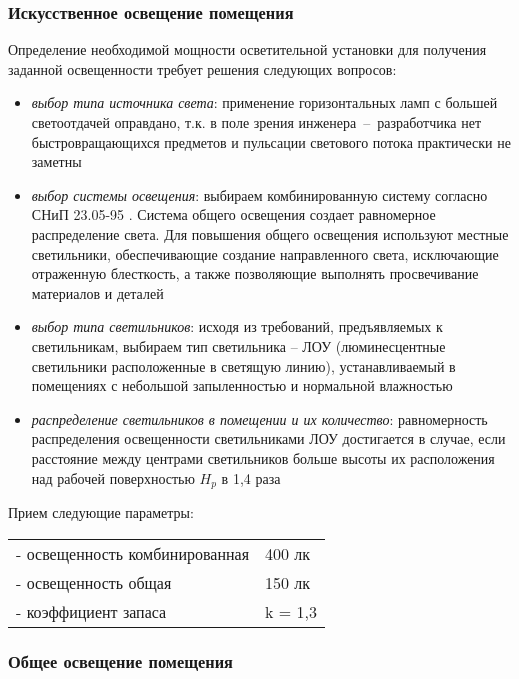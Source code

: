 \subsubsection{Искусственное освещение помещения}

Определение необходимой мощности осветительной установки для получения заданной
освещенности требует решения следующих вопросов:

\begin{itemize}
    \item \textit{выбор типа источника света}: применение горизонтальных ламп с
    большей светоотдачей оправдано, т.к. в поле зрения инженера~--~разработчика
    нет быстровращающихся предметов и пульсации светового потока практически не
    заметны

    \item \textit{выбор системы освещения}: выбираем комбинированную систему
    согласно СНиП 23.05-95 \cite{ecology_snip_23_05_85}. Система общего освещения
    создает равномерное распределение света. Для повышения общего освещения
    используют местные светильники, обеспечивающие создание направленного света,
    исключающие отраженную блесткость, а также позволяющие выполнять просвечивание
    материалов и деталей

    \item \textit{выбор типа светильников}: исходя из требований, предъявляемых
    к светильникам, выбираем тип светильника – ЛОУ (люминесцентные светильники
    расположенные в светящую линию), устанавливаемый в помещениях с небольшой
    запыленностью и нормальной влажностью

    \item \textit{распределение светильников в помещении и их количество}:
    равномерность распределения освещенности светильниками ЛОУ достигается в случае,
    если расстояние между центрами светильников больше высоты их расположения над
    рабочей поверхностью $H_p$ в 1,4 раза
\end{itemize}

Прием следующие параметры:

\begin{tabular}{ll}
    - освещенность комбинированная    & 400 лк    \\
    - освещенность общая              & 150 лк    \\
    - коэффициент запаса              & k = 1,3   \\
\end{tabular}

\subsubsection{Общее освещение помещения}

